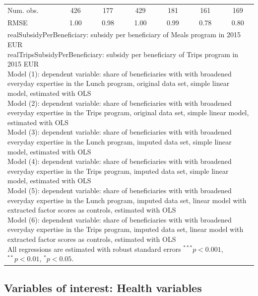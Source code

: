 \documentclass[12pt, a4paper, titlepage]{article}\usepackage[]{graphicx}\usepackage[]{color}
\begin{document}
\begin{table}
\begin{center}
{\begin{tabular}{l c c c c c c }
Num. obs.                      & 426      & 177      & 429      & 181      & 161          & 169          \\
RMSE                           & 1.00     & 0.98     & 1.00     & 0.99     & 0.78         & 0.80         \\
\hline
\multicolumn{7}{l}{\scriptsize{\parbox{\linewidth}
{\vspace{2pt} realSubsidyPerBeneficiary: subsidy per beneficiary of Meals program in 2015 EUR \\ realTripsSubsidyPerBeneficiary: subsidy per beneficiary of Trips program in 2015 EUR \\ Model (1): dependent variable: share of beneficiaries with with broadened everyday expertise in the Lunch program, original data set, simple linear model, estimated with OLS \\ Model (2): dependent variable: share of beneficiaries with with broadened everyday expertise in the Trips program, original data set, simple linear model, estimated with OLS \\ Model (3): dependent variable: share of beneficiaries with with broadened everyday expertise in the Lunch program, imputed data set, simple linear model, estimated with OLS \\ Model (4): dependent variable: share of beneficiaries with with broadened everyday expertise in the Trips program, imputed data set, simple linear model, estimated with OLS\\ Model (5): dependent variable: share of beneficiaries with with broadened everyday expertise in the Lunch program, imputed data set, linear model with extracted factor scores as controls, estimated with OLS \\ Model (6): dependent variable: share of beneficiaries with with broadened everyday expertise in the Trips program, imputed data set, linear model with extracted factor scores as controls, estimated with OLS \\ All regressions are estimated with robust standard errors $^{***}p<0.001$, $^{**}p<0.01$, $^*p<0.05$.}}}
\end{tabular}
}
\label{DayToDaySkillsRegressions}
\end{center}
\end{table}


\subsection{Variables of interest: Health variables} 
\end{document}
